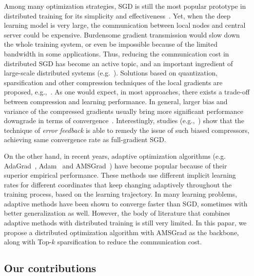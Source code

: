\documentclass[11pt]{article}
\begin{document}
Among many optimization strategies, SGD is still the most popular prototype in distributed training for its simplicity and effectiveness~\cite{chilimbi2014project,Proc:Agrawal_NIPS19,mikami2018massively}. Yet, when the deep learning model is very large, the communication between local nodes and central server could be expensive. Burdensome gradient transmission would slow down the whole training system, or even be impossible because of the limited bandwidth in some applications. Thus, reducing the communication cost in distributed SGD has become an active topic, and an important ingredient of large-scale distributed systems (e.g.~\cite{Proc:Seide14}). Solutions based on quantization, sparsification and other compression techniques of the local gradients are proposed, e.g.,~\cite{alistarh2017qsgd,wen2017terngrad,wangni2018gradient,stich2018sparsified,aji2017sparse,bernstein2018signsgd,de2017understanding,yang2019swalp,Proc:Ivkin_NIPS19}. As one would expect, in most approaches, there exists a trade-off between compression and learning performance. In general, larger bias and variance of the compressed gradients usually bring more significant performance downgrade in terms of convergence~\cite{stich2018sparsified,ajalloeian2020analysis}. Interestingly, studies (e.g.,~\cite{karimireddy2019error}) show that the technique of \textit{error feedback} is able to remedy the issue of such biased compressors, achieving same convergence rate as full-gradient SGD.


On the other hand, in recent years, adaptive optimization algorithms (e.g. AdaGrad~\cite{Duchi10-adagrad}, Adam~\cite{kingma2014adam} and AMSGrad~\cite{reddi2019convergence}) have become popular because of their superior empirical performance. These methods use different implicit learning rates for different coordinates that keep changing adaptively throughout the training process, based on the learning trajectory. In many learning problems, adaptive methods have been shown to converge faster than SGD, sometimes with better generalization as well. However, the body of literature that combines adaptive methods with distributed training is still very limited. In this papar, we propose a distributed optimization algorithm with AMSGrad as the backbone, along with Top-$k$ sparsification to reduce the communication cost.

\subsection{Our contributions}
\end{document}
